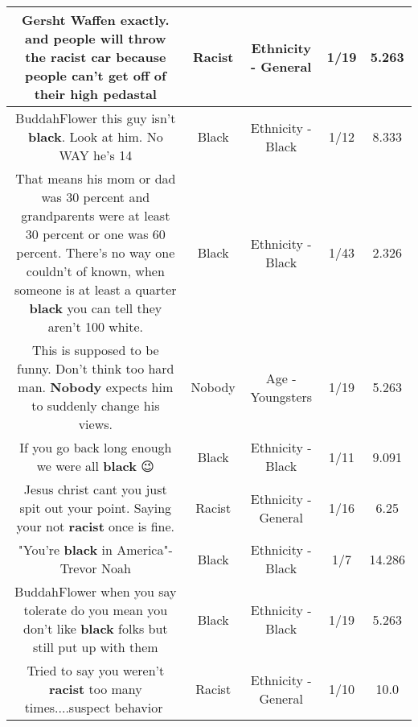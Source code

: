 \documentclass[11pt]{article}
\newlength\mylength
\begin{document}
\begin{center}
\begin{longtable}{|C{.65\mylength}|C{.30\mylength}|C{.12\mylength}|C{.12\mylength}|C{.12\mylength}|}
  \small Gersht Waffen exactly. and people will throw the \textbf{racist} car because people can't get off of their high pedastal\normalsize   & Racist & Ethnicity - General & 1/19 & 5.263 \\  \hline
  \small BuddahFlower this guy isn't \textbf{black}. Look at him. No WAY he's 14\normalsize   & Black & Ethnicity - Black & 1/12 & 8.333 \\  \hline
  \small That means his mom or dad was 30 percent and grandparents were at least  30 percent or one was 60 percent. There's no way one couldn't of known, when someone is at least a quarter \textbf{black} you can tell they aren't 100 white.\normalsize   & Black & Ethnicity - Black & 1/43 & 2.326 \\  \hline
  \small This is supposed to be funny. Don't think too hard man. \textbf{Nobody} expects him to suddenly change his views.\normalsize   & Nobody & Age - Youngsters & 1/19 & 5.263 \\  \hline
  \small If you go back long enough we were all \textbf{black} 😉\normalsize   & Black & Ethnicity - Black & 1/11 & 9.091 \\  \hline
  \small Jesus christ cant you just spit out your point. Saying your not \textbf{racist} once is fine.\normalsize   & Racist & Ethnicity - General & 1/16 & 6.25 \\  \hline
  \small "You're \textbf{black} in America"- Trevor Noah\normalsize   & Black & Ethnicity - Black & 1/7 & 14.286 \\  \hline
  \small BuddahFlower when you say tolerate do you mean you don't like \textbf{black} folks but still put up with them\normalsize   & Black & Ethnicity - Black & 1/19 & 5.263 \\  \hline
  \small Tried to say you weren't \textbf{racist} too many times....suspect behavior🤔\normalsize   & Racist & Ethnicity - General & 1/10 & 10.0 \\  \hline

\end{longtable}
\end{center}
\end{document}
